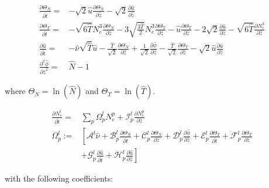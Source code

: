 \documentclass[final]{jpp}
\begin{document}
\begin{align} 
    \frac{\partial \Theta_N}{\partial \hat{t}} =& - \sqrt{2}\hat{u} \frac{\partial \Theta_N}{\partial \hat{z}} - \sqrt{2} \frac{\partial \hat{u}}{\partial \hat{z}} \label{eq:dlnNdt}
    \\
    \frac{\partial\Theta_T}{\partial \hat t} =& 
    -\sqrt{6\hat{T}}N_e^3 \frac{\partial\Theta_N}{\partial \hat{z}}
    -3 \sqrt{\frac{3\hat{T}}{2}} N_e^3 \frac{\partial\Theta_T}{\partial \hat{z}}
    - \hat{u} \frac{\partial\Theta_T}{\partial \hat{z}}
    - 2 \sqrt{2} \frac{\partial \hat{u}}{\partial \hat{z}} 
    - \sqrt{6\hat{T}} \frac{\partial N_e^3}{\partial\hat{z}}
    \label{eq:dlnTdt}
    \\
    \frac{\partial \hat{u}}{\partial \hat t} =& 
    - \hat{\nu} \sqrt{\hat{T}} \hat{u}
    -\frac{\hat{T}}{\sqrt{2}} \frac{\partial \Theta_N}{\partial \hat{z}}
    +\frac{1}{\sqrt{2}}\frac{\partial \hat{\phi}}{\partial \hat{z}}
    -\frac{\hat{T}}{\sqrt{2}} \frac{\partial\Theta_T}{\partial \hat{z}}
    - \sqrt{2} \hat{u} \frac{\partial \hat{u}}{\partial \hat{z}}
    \label{eq:dudt}
    \\
    \frac{\partial^2\hat{\phi}}{\partial \hat{z}^2}=&\hat{N}-1 \label{eq:poisson}
\end{align}

where $\Theta_N = \ln(\hat{N})$ and $\Theta_T = \ln(\hat{T})$.

\begin{align} \label{eq:moment-hierarchy}
\frac{\partial N_e^l}{\partial \hat{t}} =& \sum_p \Omega_p^l N_e^p + \mathcal{I}_p^l \frac{\partial N_e^p}{\partial\hat{z}}  \\
\Omega_p^l :=& \left[ \mathcal{A}^l \hat{\nu} +  \mathcal{B}_p^l \frac{\partial \Theta_N}{\partial \hat{t}} + \mathcal{C}_p^l  \frac{\partial \Theta_N}{\partial \hat{z}}+ \mathcal{D}_p^l \frac{\partial \hat\phi}{\partial \hat{z}}  + \mathcal{E}_p^l \frac{\partial \Theta_T}{\partial \hat{t}} + \mathcal{F}_p^l \frac{\partial \Theta_T}{\partial \hat{z}} \right. \nonumber\\
&\left. + \mathcal{G}_p^l \frac{\partial \hat{u}}{\partial \hat{t}} + \mathcal{H}_p^l  \frac{\partial \hat{u}}{\partial \hat{z}} \right]
\end{align}

with the following coefficients:
\end{document}
